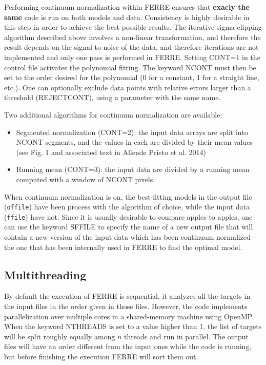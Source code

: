 \documentclass[12pt]{article}
\begin{document}
Performing continuum normalization within FERRE ensures that {\bf exacly the same} 
code is run on both models and data.
Consistency is highly desirable in this step in order to achieve the best possible results.
The iterative sigma-clipping algorithm described above involves a non-linear transformation,
and therefore the result depends on the signal-to-noise of the data, and therefore 
iterations are not implemented and only one pass is performed in FERRE. 
Setting CONT=1 in the control file activates the polynomial fitting. The keyword NCONT 
must then be set to the order desired for the polynomial (0 for a constant, 
1 for a straight line, etc.). One can optionally exclude data points with relative errors 
larger than a threshold (REJECTCONT), using a parameter with the same name.

Two additional algorithms for continuum normalization are available:
\begin{itemize}
\item Segmented normalization (CONT=2): the input data arrays are split into NCONT segments, 
and the values in each are divided by their mean values (see Fig. 1 and associated text in 
Allende Prieto et al. 2014)
\item Running mean (CONT=3): the input data are divided by a running mean computed with a window of NCONT pixels.
\end{itemize}

When continuum normalization is on, the best-fitting models in the output file ({\tt offile})
have been process with the algorithm of choice, while the input data ({\tt ffile}) have not.
Since it is usually desirable to compare apples to apples, one can use the keyword 
SFFILE to specify the name of a new output file that will contain a new version of the input data
which has been continuum normalized -- the one that has been internally used in FERRE to 
find the optimal model.


\subsection{Multithreading}

By default the execution of FERRE is sequential, it analyzes all the targets in 
the input files in the order given in those files. However, the code implements 
parallelization over multiple cores in a shared-memory machine using OpenMP.
When the keyword NTHREADS is set to a value higher than 1, the list of targets
will be split roughly equally among $n$ threads and run in parallel. The output
files will have an order different from the input ones while the code is running,
but before finishing the execution FERRE will sort them out.
\end{document}
